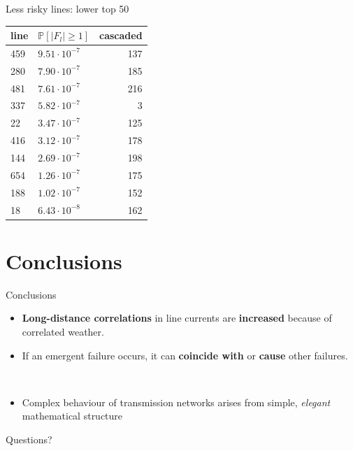 \documentclass[10pt]{beamer}
\begin{document}
\begin{frame}{Less risky lines: lower top 50}
\begin{table}
\begin{tabular}{llr}
\toprule
line & $\mathbb{P}[|F_l| \geq 1]$ & cascaded \\
\midrule
459 &  $9.51\cdot 10^{-7}$ &      137 \\
280 &  $7.90\cdot 10^{-7}$ &      185 \\
481 &  $7.61\cdot 10^{-7}$ &      216 \\
337 &  $5.82\cdot 10^{-7}$ &        3 \\
22  &  $3.47\cdot 10^{-7}$ &      125 \\
416 &  $3.12\cdot 10^{-7}$ &      178 \\
144 &  $2.69\cdot 10^{-7}$ &      198 \\
654 &  $1.26\cdot 10^{-7}$ &      175 \\
188 &  $1.02\cdot 10^{-7}$ &      152 \\
18  &  $6.43\cdot 10^{-8}$ &      162 \\
\bottomrule
\end{tabular}

\end{table}
\end{frame}

\section{Conclusions}
\begin{frame}{Conclusions}
\begin{itemize}
\item \textbf{Long-distance correlations} in line currents are \textbf{increased} because of correlated weather.
\item \alert{If an emergent failure occurs, it can \textbf{coincide with} or \textbf{cause} other failures.}
\end{itemize}
\hphantom{x}\\[2em]
\begin{itemize}
\item Complex behaviour of transmission networks arises from simple, \emph{elegant} mathematical structure
\end{itemize}
\end{frame}


{
\begin{frame}[standout]
  Questions?
\end{frame}
}
\end{document}
